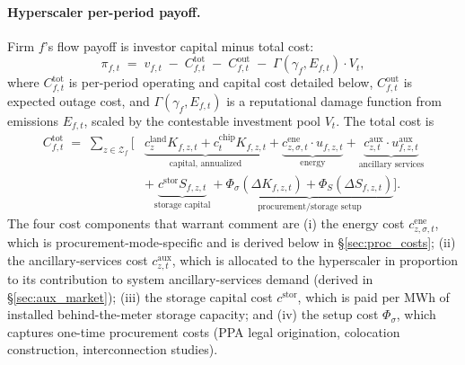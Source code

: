 \documentclass[12pt,letterpaper]{article}
\begin{document}
\paragraph{Hyperscaler per-period payoff.} Firm $f$'s flow payoff is
investor capital minus total cost:
\begin{equation}
\label{eq:hyper_flow}
\pi_{f,t} \;=\; v_{f,t} \;-\; C^{\mathrm{tot}}_{f,t} \;-\; C^{\mathrm{out}}_{f,t}
\;-\; \Gamma(\gamma_f, E_{f,t}) \cdot V_t,
\end{equation}
where $C^{\mathrm{tot}}_{f,t}$ is per-period operating and capital cost
detailed below, $C^{\mathrm{out}}_{f,t}$ is expected outage cost, and
$\Gamma(\gamma_f, E_{f,t})$ is a reputational damage function from emissions
$E_{f,t}$, scaled by the contestable investment pool $V_t$. The total cost is
\begin{equation}
\label{eq:hyper_cost}
\begin{aligned}
C^{\mathrm{tot}}_{f,t} \;=\; \sum_{z \in \mathcal{Z}_f}\Big[
& \underbrace{c^{\mathrm{land}}_z K_{f,z,t} + c^{\mathrm{chip}}_t K_{f,z,t}}_{\text{capital, annualized}}
+ \underbrace{c^{\mathrm{ene}}_{z,\sigma,t} \cdot u_{f,z,t}}_{\text{energy}}
+ \underbrace{c^{\mathrm{aux}}_{z,t} \cdot u^{\mathrm{aux}}_{f,z,t}}_{\text{ancillary services}} \\
& + \underbrace{c^{\mathrm{stor}} S_{f,z,t}}_{\text{storage capital}}
+ \underbrace{\Phi_\sigma(\Delta K_{f,z,t}) + \Phi_S(\Delta S_{f,z,t})}_{\text{procurement/storage setup}}
\Big].
\end{aligned}
\end{equation}
The four cost components that warrant comment are (i) the energy cost
$c^{\mathrm{ene}}_{z,\sigma,t}$, which is procurement-mode-specific and is
derived below in \S\ref{sec:proc_costs}; (ii) the ancillary-services cost
$c^{\mathrm{aux}}_{z,t}$, which is allocated to the hyperscaler in
proportion to its contribution to system ancillary-services demand (derived
in \S\ref{sec:aux_market}); (iii) the storage capital cost $c^{\mathrm{stor}}$,
which is paid per MWh of installed behind-the-meter storage capacity; and
(iv) the setup cost $\Phi_\sigma$, which captures one-time procurement
costs (PPA legal origination, colocation construction, interconnection
studies).
\end{document}
